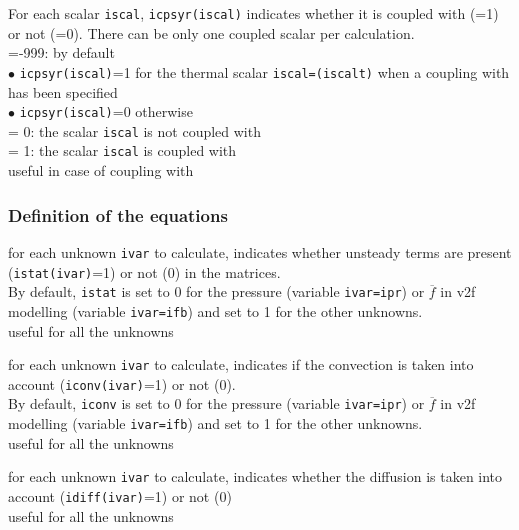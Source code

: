 {For each scalar {\tt iscal}, {\tt icpsyr(iscal)} indicates whether it is
coupled with \syrthes (=1) or not (=0).
There can be only one coupled scalar per calculation.\\
\hspace*{1.3cm}=-999: by default\\
\hspace*{2.cm} $\bullet$ {\tt icpsyr(iscal)}=1 for the thermal scalar
{\tt iscal=(iscalt)} when a coupling with \syrthes has been specified\\
\hspace*{2.cm} $\bullet$ {\tt icpsyr(iscal)}=0 otherwise\\
\hspace*{1.3cm}= 0: the scalar {\tt iscal} is not coupled with \syrthes\\
\hspace*{1.3cm}= 1: the scalar {\tt iscal} is coupled with \syrthes\\
useful in case of coupling with \syrthes}


\subsubsection{Definition of the equations}

{for each unknown {\tt ivar} to calculate, indicates whether
unsteady terms are present ({\tt istat(ivar)}=1) or not (0) in the matrices.\\
By default, {\tt istat} is set to 0 for the pressure (variable {\tt ivar=ipr})
or $\overline{f}$ in v2f modelling (variable {\tt ivar=ifb}) and set to
1 for the other unknowns.\\
useful for all the unknowns}

{for each unknown {\tt ivar} to calculate, indicates if the
convection is taken into account ({\tt iconv(ivar)}=1) or not (0).\\
By default, {\tt iconv} is set to 0 for the pressure (variable {\tt ivar=ipr})
or $\overline{f}$ in v2f modelling (variable {\tt ivar=ifb}) and set to
1 for the other unknowns.\\
useful for all the unknowns}

{for each unknown {\tt ivar} to calculate, indicates whether the
diffusion is taken into account ({\tt idiff(ivar)}=1) or not (0)\\
useful for all the unknowns}

